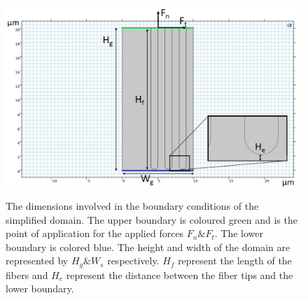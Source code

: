\begin{figure}[h!] 
    \includegraphics[width=0.8\linewidth, height=7.5cm, angle=0]{images/discrete_model_implementation/lever_distance.png}
    \caption{The dimensions involved in the boundary conditions of the simplified domain. The upper boundary is coloured green and is the point of application for the applied forces $F_n \& F_t$. The lower boundary is colored blue. The height and width of the domain are represented by $H_g \& W_s$ respectively. $H_f$ represent the length of the fibers and $H_e$ represent the distance between the fiber tips and the lower boundary.}
    \label{fig:boundary_conditions}
\end{figure}

